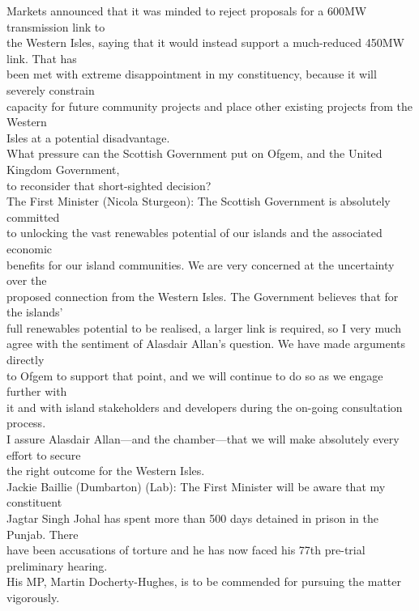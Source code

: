 \documentclass{article}
\begin{document}
\begin{description}
{Markets announced that it was minded to reject proposals for a 600MW transmission link to\\
the Western Isles, saying that it would instead support a much-reduced 450MW link. That has\\
been met with extreme disappointment in my constituency, because it will severely constrain\\
capacity for future community projects and place other existing projects from the Western\\
Isles at a potential disadvantage.\\
What pressure can the Scottish Government put on Ofgem, and the United Kingdom Government,\\
to reconsider that short-sighted decision?\\
The First Minister (Nicola Sturgeon): The Scottish Government is absolutely committed\\
to unlocking the vast renewables potential of our islands and the associated economic\\
benefits for our island communities. We are very concerned at the uncertainty over the\\
proposed connection from the Western Isles. The Government believes that for the islands’\\
full renewables potential to be realised, a larger link is required, so I very much\\
agree with the sentiment of Alasdair Allan’s question. We have made arguments directly\\
to Ofgem to support that point, and we will continue to do so as we engage further with\\
it and with island stakeholders and developers during the on-going consultation process.\\
I assure Alasdair Allan—and the chamber—that we will make absolutely every effort to secure\\
the right outcome for the Western Isles.\\
Jackie Baillie (Dumbarton) (Lab): The First Minister will be aware that my constituent\\
Jagtar Singh Johal has spent more than 500 days detained in prison in the Punjab. There\\
have been accusations of torture and he has now faced his 77th pre-trial preliminary hearing.\\
His MP, Martin Docherty-Hughes, is to be commended for pursuing the matter vigorously.\\
}
\end{description}
\end{document}
